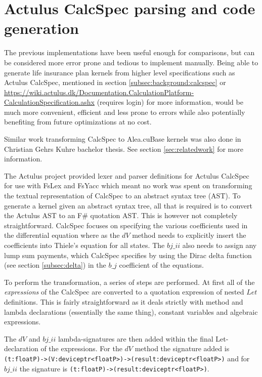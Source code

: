 \section{Actulus CalcSpec parsing and code generation}\label{sec:calcspecgeneration}
The previous implementations have been useful enough for comparisons, but can be considered more error prone and tedious to implement manually.
Being able to generate life insurance plan kernels from higher level specifications such as Actulus CalcSpec, mentioned in section \ref{subsec:background:calcspec} or \url{https://wiki.actulus.dk/Documentation.CalculationPlatform-CalculationSpecification.ashx} (requires login) for more information, would be much more convenient, efficient and less prone to errors while also potentially benefiting from future optimizations at no cost.

Similar work transforming CalcSpec to Alea.cuBase kernels was also done in Christian Gehrs Kuhre bachelor thesis.
See section \ref{sec:relatedwork} for more information.

The Actulus project provided lexer and parser definitions for Actulus CalcSpec for use with FsLex and FsYacc\cite{fslexfsyacc} which meant no work was spent on transforming the textual representation of CalcSpec to an abstract syntax tree (AST).
To generate a kernel given an abstract syntax tree, all that is required is to convert the Actulus AST to an F\# quotation AST.
This is however not completely straightforward.
CalcSpec focuses on specifying the various coefficients used in the differential equation where as the $dV$ method needs to explicitly insert the coefficients into Thiele's equation for all states. 
The $bj\_ii$ also needs to assign any lump sum payments, which CalcSpec specifies by using the Dirac delta function (see section \ref{subsec:delta}) in the $b\_j$ coefficient of the equations.

To perform the transformation, a series of steps are performed.
At first all of the \emph{expressions} of the CalcSpec are converted to a quotation expression of nested $Let$ definitions.
This is fairly straightforward as it deals strictly with method and lambda declarations (essentially the same thing), constant variables and algebraic expressions.


The $dV$ and $bj\_ii$ lambda-signatures are then added within the final Let-declaration of the expressions.
For the $dV$ method the signature added is \lstinline$(t:floatP)->(V:deviceptr<floatP>)->(result:deviceptr<floatP>)$ and for $bj\_ii$ the signature is \lstinline$(t:floatP)->(result:deviceptr<floatP>)$.

